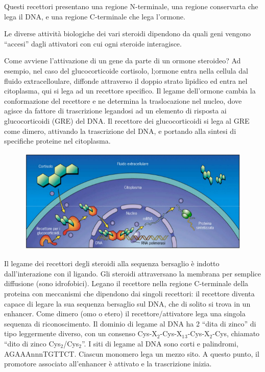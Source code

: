 \documentclass[11pt]{book}
\begin{document}
Questi recettori presentano una regione N-terminale, una regione
conservarta che lega il DNA, e una regione C-terminale che lega
l'ormone.

Le diverse attività biologiche dei vari steroidi dipendono da quali geni
vengono ``accesi'' dagli attivatori con cui ogni steroide interagisce.

Come avviene l'attivazione di un gene da parte di un ormone steroideo?
Ad esempio, nel caso del glucocorticoide cortisolo, l;ormone entra nella
cellula dal fluido extracelloulare, diffonde attraverso il doppio strato
lipidico ed entra nel citoplasma, qui si lega ad un recettore specifico.
Il legame dell'ormone cambia la conformazione del recettore e ne
determina la traslocazione nel nucleo, dove agisce da fattore di
trascrizione legandosi ad un elemento di risposta ai glucocorticoidi
(GRE) del DNA. Il recettore dei glucocorticoidi si lega al GRE come
dimero, attivando la trascrizione del DNA, e portando alla sintesi di
specifiche proteine nel citoplasma.

\begin{figure}[htp]
\centering
\includegraphics[scale=1.00]{img/42_Glucocorticoidi.png}
\caption{}
\label{glucocorticoidi2}
\end{figure}

Il legame dei recettori degli steroidi alla sequenza bersaglio è indotto
dall'interazione con il ligando. Gli steroidi attraversano la membrana
per semplice diffusione (sono idrofobici). Legano il recettore nella
regione C-terminale della proteina con meccanismi che dipendono dai
singoli recettori: il recettore diventa capace di legare la sua sequenza
bersaglio sul DNA, che di solito si trova in un enhancer. Come dimero
(omo o etero) il recettore/attivatore lega una singola sequenza di
riconoscimento. Il dominio di legame al DNA ha 2 ``dita di zinco'' di
tipo leggermente diverso, con un consenso
Cys-X\(_2\)-Cys-X\(_1\)\(_3\)-Cys-X\(_2\)-Cys, chiamato ``dito di zinco
Cys\(_2\)/Cys\(_2\)''. I siti di legame al DNA sono corti e palindromi,
AGAAAnnnTGTTCT. Ciascun monomero lega un mezzo sito. A questo punto, il
promotore associato all'enhancer è attivato e la trascrizione inizia.
\end{document}
